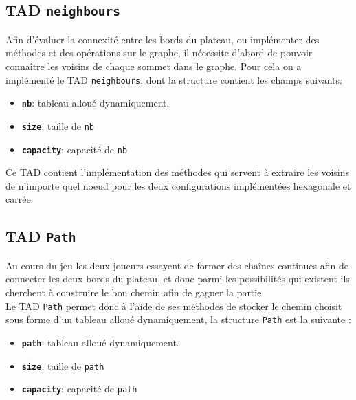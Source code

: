 \documentclass[a4paper,10pt]{article}
\begin{document}
\subsection{TAD \texttt{neighbours}}
Afin d'évaluer la connexité entre les bords du plateau, ou implémenter des méthodes et des opérations sur le graphe, il nécessite d'abord de pouvoir connaître les voisins de chaque sommet dans le graphe. Pour cela on a implémenté le TAD \texttt{neighbours}, dont la structure contient les champs suivants:
\begin{itemize}
    \item \textbf{\texttt{nb}}: tableau alloué dynamiquement.
    \item \textbf{\texttt{size}}: taille de \texttt{nb}
    \item \textbf{\texttt{capacity}}: capacité de \texttt{nb}
\end{itemize}
Ce TAD contient l'implémentation des méthodes qui servent à extraire les voisins de n'importe quel noeud pour les deux configurations implémentées hexagonale et carrée.  

\subsection{TAD \texttt{Path}}
Au cours du jeu les deux joueurs essayent de former des chaînes continues afin de connecter les deux bords du plateau, et donc parmi les possibilités qui existent ils cherchent à construire le bon chemin afin de gagner la partie.\\
Le TAD \texttt{Path} permet donc à l'aide de ses méthodes de stocker le chemin choisit sous forme d'un tableau alloué dynamiquement, la structure \texttt{Path} est la suivante :
\begin{itemize}
    \item \textbf{\texttt{path}}: tableau alloué dynamiquement.
    \item \textbf{\texttt{size}}: taille de \texttt{path}
    \item \textbf{\texttt{capacity}}: capacité de \texttt{path}
\end{itemize}
\end{document}
